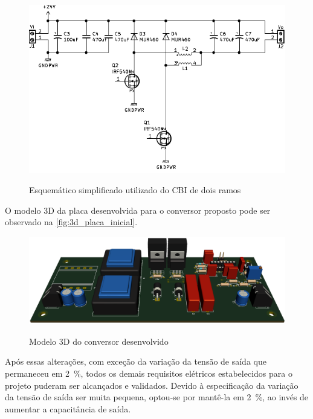     \begin{figure}[H]
    	\centering
    	\caption{Esquemático simplificado utilizado do CBI de dois ramos}
    	\includegraphics[scale=1.2]{pdf/layout/Esquematico_CBI_simples.pdf}
        \label{fig:esquematico_cbi_1}
    \end{figure}
    
    O modelo 3D da placa desenvolvida para o conversor proposto pode ser observado na \autoref{fig:3d_placa_inicial}.
    
    \begin{figure}[H]
    	\centering
    	\caption{Modelo 3D do conversor desenvolvido}
    	\includegraphics[scale=.35]{pdf/fotos/placa_inicial.png}
        \label{fig:3d_placa_inicial}
    \end{figure}
    
    Após essas alterações, com exceção da variação da tensão de saída que permaneceu em \qty{2}{\%}, todos os demais requisitos elétricos estabelecidos para o projeto puderam ser alcançados e validados. Devido à especificação da variação da tensão de saída ser muita pequena, optou-se por mantê-la em \qty{2}{\%}, ao invés de aumentar a capacitância de saída.
    
